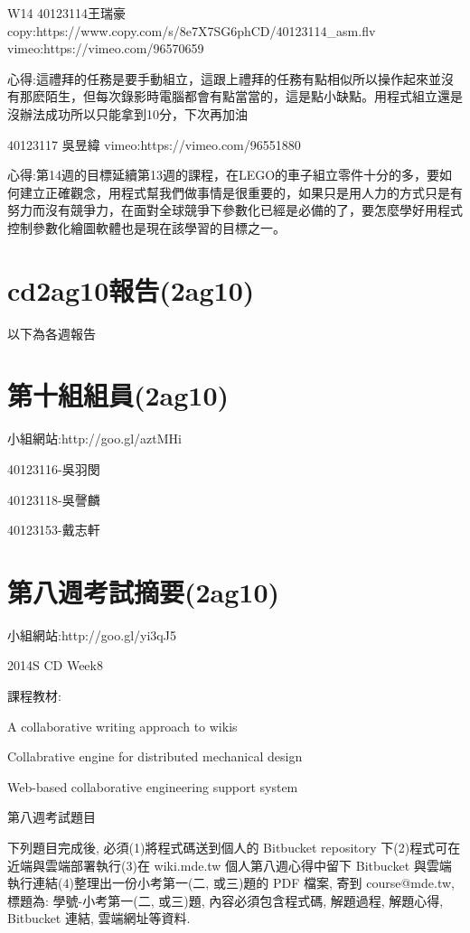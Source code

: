 \documentclass[]{article}
\begin{document}
W14 40123114王瑞豪
copy:https://www.copy.com/s/8e7X7SG6phCD/40123114\_asm.flv
vimeo:https://vimeo.com/96570659

心得:這禮拜的任務是要手動組立，這跟上禮拜的任務有點相似所以操作起來並沒有那麽陌生，但每次錄影時電腦都會有點當當的，這是點小缺點。用程式組立還是沒辦法成功所以只能拿到10分，下次再加油

40123117 吳昱緯 vimeo:https://vimeo.com/96551880

心得:第14週的目標延續第13週的課程，在LEGO的車子組立零件十分的多，要如何建立正確觀念，用程式幫我們做事情是很重要的，如果只是用人力的方式只是有努力而沒有競爭力，在面對全球競爭下參數化已經是必備的了，要怎麼學好用程式控制參數化繪圖軟體也是現在該學習的目標之一。

\section{cd2ag10報告(2ag10)}\label{cd2ag10ux5831ux544a2ag10}

以下為各週報告

\section{第十組組員(2ag10)}\label{ux7b2cux5341ux7d44ux7d44ux54e12ag10}

小組網站:http://goo.gl/aztMHi

40123116-吳羽閔

40123118-吳謦麟

40123153-戴志軒

\section{第八週考試摘要(2ag10)}\label{ux7b2cux516bux9031ux8003ux8a66ux6458ux89812ag10}

小組網站:http://goo.gl/yi3qJ5

2014S CD Week8

課程教材:

A collaborative writing approach to wikis

Collabrative engine for distributed mechanical design

Web-based collaborative engineering support system

第八週考試題目

下列題目完成後, 必須(1)將程式碼送到個人的 Bitbucket repository
下(2)程式可在近端與雲端部署執行(3)在 wiki.mde.tw 個人第八週心得中留下
Bitbucket 與雲端執行連結(4)整理出一份小考第一(二, 或三)題的 PDF 檔案,
寄到 course@mde.tw, 標題為: 學號-小考第一(二, 或三)題,
內容必須包含程式碼, 解題過程, 解題心得, Bitbucket 連結, 雲端網址等資料.
\end{document}
